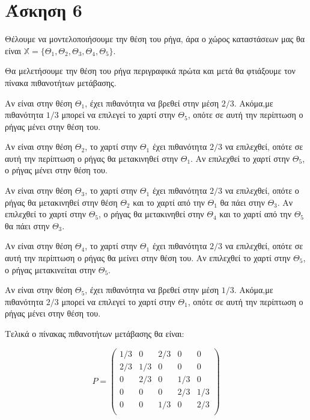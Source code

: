 \documentclass[11pt,a4paper]{article}
\begin{document}
\section*{Άσκηση 6}

Θέλουμε να μοντελοποιήσουμε την θέση του ρήγα, άρα ο χώρος καταστάσεων μας θα είναι $\mathbb{X} = \{Θ_1, Θ_2, Θ_3, Θ_4, Θ_5\}$.

Θα μελετήσουμε την θέση του ρήγα περιγραφικά πρώτα και μετά θα φτιάξουμε τον πίνακα πιθανοτήτων μετάβασης.

Αν είναι στην θέση $Θ_1$, έχει πιθανότητα να βρεθεί στην μέση $2/3$. Ακόμα,με πιθανότητα $1/3$ μπορεί να επιλεγεί το χαρτί στην $Θ_5$, οπότε σε αυτή την περίπτωση ο ρήγας μένει στην θέση του.

Αν είναι στην θέση $Θ_2$, το χαρτί στην $Θ_1$ έχει πιθανότητα $2/3$ να επιλεχθεί, οπότε σε αυτή την περίπτωση ο ρήγας θα μετακινηθεί στην $Θ_1$. Αν επιλεχθεί το χαρτί στην $Θ_5$, ο ρήγας μένει στην θέση του.

Αν είναι στην θέση $Θ_3$, το χαρτί στην $Θ_1$ έχει πιθανότητα $2/3$ να επιλεχθεί, οπότε ο ρήγας θα μετακινηθεί στην θέση $Θ_2$ και το χαρτί από την $Θ_1$ θα πάει στην $Θ_3$.  Αν επιλεχθεί το χαρτί στην $Θ_5$, ο ρήγας θα μετακινηθεί στην $Θ_4$ και το χαρτί από την $Θ_5$ θα πάει στην $Θ_3$.

Αν είναι στην θέση $Θ_4$, το χαρτί στην $Θ_1$ έχει πιθανότητα $2/3$ να επιλεχθεί, οπότε σε αυτή την περίπτωση ο ρήγας θα μείνει στην θέση του. Αν επιλεχθεί το χαρτί στην $Θ_5$, ο ρήγας μετακινείται στην $Θ_5$.

Αν είναι στην θέση $Θ_5$, έχει πιθανότητα να βρεθεί στην μέση $1/3$. Ακόμα,με πιθανότητα $2/3$ μπορεί να επιλεγεί το χαρτί στην $Θ_1$, οπότε σε αυτή την περίπτωση ο ρήγας μένει στην θέση του.

Τελικά ο πίνακας πιθανοτήτων μετάβασης θα είναι:

\begin{equation*}
    P = 
    \begin{pmatrix}
        1/3 & 0   & 2/3 & 0   & 0   \\
        2/3 & 1/3 & 0   & 0   & 0   \\
        0   & 2/3 & 0   & 1/3 & 0   \\
        0   & 0   & 0   & 2/3 & 1/3 \\
        0   & 0   & 1/3 & 0   & 2/3 \\
    \end{pmatrix}
\end{equation*}
\end{document}
